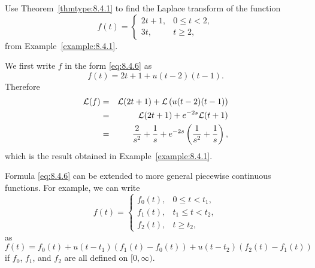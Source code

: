 \documentclass{ximera}
\begin{document}
\begin{example}\label{example:8.4.3}
Use Theorem~\ref{thmtype:8.4.1} to find the Laplace transform of the
function
$$
f(t)=\left\{\begin{array}{cl} 2t+1,&0\leq t<2,\\ 3t,&t\geq 2,
\end{array}\right.
$$
from Example~\ref{example:8.4.1}.


\begin{explanation}
We first write $f$ in the form \eqref{eq:8.4.6} as
$$
f(t)=2t+1+u(t-2)(t-1).
$$
Therefore
\begin{eqnarray*}
{\cal L}(f)&=&{\cal L}(2t+1) +{\cal L}\left(u(t-2)(t-1)\right)\\
&=&{\cal L}(2t+1) +e^{-2s}{\cal L}(t+1)\\
&=&\frac{2}{s^2}+\frac{1}{s}+e^{-2s}\left(\frac{1}{s^2}+\frac{1}{s}\right),
\end{eqnarray*}
which is the result obtained in Example~\ref{example:8.4.1}.

Formula \eqref{eq:8.4.6} can be extended to more general piecewise continuous
functions. For example, we can write
$$
f(t)=\left\{\begin{array}{rl}
f_0(t),&0\leq t<t_1,\\
f_1(t),&t_1\leq t<t_2,\\
f_2(t),&t\geq t_2,
\end{array}\right.
$$
as
$$
f(t)=f_0(t)+u(t-t_1)\left(f_1(t)-f_0(t)\right)+
u(t-t_2)\left(f_2(t)-f_1(t)\right)
$$
if $f_0$, $f_1$, and $f_2$ are all defined on $[0,\infty)$.
\end{explanation}
\end{example}
\end{document}
